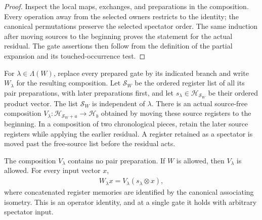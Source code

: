 \begin{proof}
    \leanok
    Inspect the local maps, exchanges, and preparations in the composition.
    Every operation away from the selected owners restricts to the identity;
    the canonical permutations preserve the selected spectator order. The
    same induction after moving sources to the beginning proves the statement
    for the actual residual. The gate assertions then follow from the definition
    of the partial expansion and its touched-occurrence test.
\end{proof}

\begin{definition}
    \label{def:peps_chrono_complete_branch}
    \leanok
    For $\lambda\in\Lambda(W)$, replace every prepared gate by its indicated
    branch and write $W_\lambda$ for the resulting composition. Let $\mathcal S_W$
    be the ordered register list of all its pair preparations, with later
    preparations first, and let $s_\lambda\in\mathcal H_{\mathcal S_W}$ be their
    ordered product vector. The list $\mathcal S_W$ is independent of $\lambda$.
    There is an actual source-free composition
    $V_\lambda:\mathcal H_{\mathcal S_W\mathbin{+}a}\to\mathcal H_b$ obtained
    by moving these source registers to the beginning. In a composition of two
    chronological pieces, retain the later source registers while applying the
    earlier residual. A register retained as a spectator is moved past the
    free-source list before the residual acts.
\end{definition}

\begin{theorem}
    \label{thm:peps_chrono_complete_preparation}
    \leanok
    The composition $V_\lambda$ contains no pair preparation. If $W$ is allowed,
    then $V_\lambda$ is allowed. For every input vector $x$,
    \begin{align}
        W_\lambda x=V_\lambda(s_\lambda\otimes x),
        \label{eq:peps_chrono_complete_preparation}
    \end{align}
    where concatenated register memories are identified by the canonical
    associating isometry. This is an operator identity, and at a single gate
    it holds with arbitrary spectator input.
\end{theorem}

